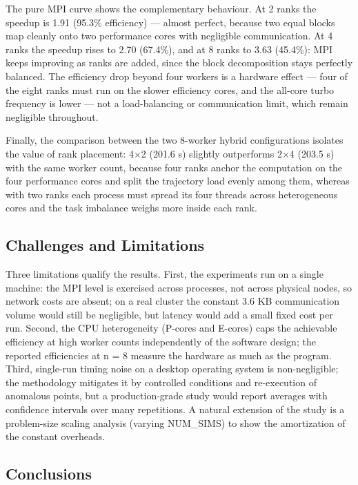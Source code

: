 \documentclass[12pt,a4paper]{article}
\begin{document}
The pure MPI curve shows the complementary behaviour. At 2 ranks the
speedup is 1.91 (95.3\% efficiency) --- almost perfect, because two
equal blocks map cleanly onto two performance cores with negligible
communication. At 4 ranks the speedup rises to 2.70 (67.4\%), and at 8
ranks to 3.63 (45.4\%): MPI
keeps improving as ranks are added, since the block decomposition stays
perfectly balanced. The efficiency drop beyond four workers is a
hardware effect --- four of the eight ranks must run on the slower
efficiency cores, and the all-core turbo frequency is lower --- not a
load-balancing or communication limit, which remain negligible
throughout.

Finally, the comparison between the two 8-worker hybrid configurations
isolates the value of rank placement: 4$\times$2 (201.6 s) slightly outperforms
2$\times$4 (203.5 s) with the same worker count, because four ranks anchor the
computation on the four performance cores and split the trajectory load
evenly among them, whereas with two ranks each process must spread its
four threads across heterogeneous cores and the task imbalance weighs
more inside each rank.

\subsection{Challenges and Limitations}

Three limitations qualify the results. First, the experiments run on a
single machine: the MPI level is exercised across processes, not across
physical nodes, so network costs are absent; on a real cluster the
constant 3.6 KB communication volume would still be negligible, but
latency would add a small fixed cost per run. Second, the CPU
heterogeneity (P-cores and E-cores) caps the achievable efficiency at
high worker counts independently of the software design; the reported
efficiencies at n = 8 measure the hardware as much as the program.
Third, single-run timing noise on a desktop operating system is
non-negligible; the methodology mitigates it by controlled conditions
and re-execution of anomalous points, but a production-grade study would
report averages with confidence intervals over many repetitions. A
natural extension of the study is a problem-size scaling analysis
(varying NUM\_SIMS) to show the amortization of the constant overheads.

\subsection{Conclusions}
\end{document}
